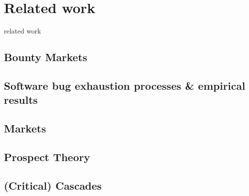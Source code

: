 \section{Related work}
\label{sec:related}

related work

\subsection{Bounty Markets }

\subsection{Software bug exhaustion processes \& empirical results}

\subsection{Markets}

\subsection{Prospect Theory}

\subsection{(Critical) Cascades}
